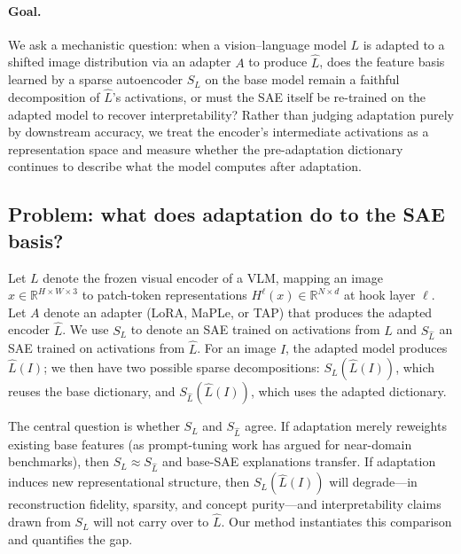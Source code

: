 

\paragraph{Goal.}
We ask a mechanistic question: when a vision--language model $L$ is adapted
to a shifted image distribution via an adapter $A$ to produce $\hat{L}$, does
the feature basis learned by a sparse autoencoder $S_L$ on the base model
remain a faithful decomposition of $\hat{L}$'s activations, or must the SAE
itself be re-trained on the adapted model to recover interpretability?
Rather than judging adaptation purely by downstream accuracy, we treat the
encoder's intermediate activations as a representation space and measure
whether the pre-adaptation dictionary continues to describe what the model
computes after adaptation.

\subsection{Problem: what does adaptation do to the SAE basis?}
\label{sec:method-problem}

Let $L$ denote the frozen visual encoder of a VLM, mapping an image
$x \in \mathbb{R}^{H \times W \times 3}$ to patch-token representations
$H^{\ell}(x) \in \mathbb{R}^{N \times d}$ at hook layer $\ell$. Let $A$
denote an adapter (LoRA, MaPLe, or TAP) that produces the adapted encoder
$\hat{L}$. We use $S_L$ to denote an SAE trained on activations from $L$
and $S_{\hat{L}}$ an SAE trained on activations from $\hat{L}$. For an
image $I$, the adapted model produces $\hat{L}(I)$; we then have two
possible sparse decompositions: $S_L(\hat{L}(I))$, which reuses the base
dictionary, and $S_{\hat{L}}(\hat{L}(I))$, which uses the adapted dictionary.

The central question is whether $S_L$ and $S_{\hat{L}}$ agree. If adaptation
merely reweights existing base features (as prompt-tuning work has argued
for near-domain benchmarks), then $S_L \approx S_{\hat{L}}$ and base-SAE
explanations transfer. If adaptation induces new representational structure,
then $S_L(\hat{L}(I))$ will degrade---in reconstruction fidelity, sparsity,
and concept purity---and interpretability claims drawn from $S_L$ will not
carry over to $\hat{L}$. Our method instantiates this comparison and
quantifies the gap.


